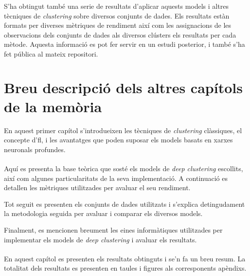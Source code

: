 \documentclass[CAT,BIB]{TFUOC}%
\begin{document}
        S'ha obtingut també una serie de resultats
        d'aplicar aquests models i altres tècniques de \textit{clustering}
        sobre diversos conjunts de dades.
        Els resultats estàn formats per diverses mètriques de rendiment
        així com les assignacions de les observacions dels conjunts de dades
        als diversos clústers els resultats per cada mètode.
        Aquesta informació es pot fer servir en un estudi posterior,
        i també s'ha fet pública al mateix repositori.

    \section{Breu descripció dels altres capítols de la memòria}

    \paragraph{ }
        En aquest primer capítol
        s'introdueixen les tècniques de \textit{clustering} clàssiques,
        el concepte d'\gls{fl},
        i les avantatges que poden suposar els models basats en xarxes neuronals profundes.

    \paragraph{ }
        Aquí es presenta la base teòrica que sosté
        els models de \textit{deep clustering} escollits,
        així com algunes particularitats de la seva implementació.
        A continuació es detallen les mètriques
        utilitzades per avaluar el seu rendiment.

        Tot seguit
        es presenten els conjunts de dades utilitzats
        i s'explica detingudament la metodologia seguida
        per avaluar i comparar els diversos models.

        Finalment,
        es mencionen breument les eines informàtiques utilitzades
        per implementar els models de \textit{deep clustering}
        i avaluar els resultats.

    \paragraph{ }
        En aquest capítol
        es presenten els resultats obtinguts
        i se'n fa un breu resum.
        La totalitat dels resultats
        es presenten en taules i figures als corresponents apèndixs.
\end{document}
